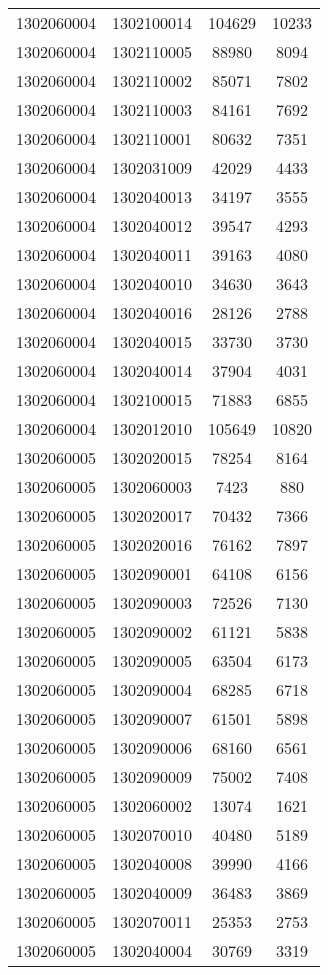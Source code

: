 \begin{longtable}{llcc}
1302060004 & 1302100014 & 104629 & 10233\\
1302060004 & 1302110005 & 88980 & 8094\\
1302060004 & 1302110002 & 85071 & 7802\\
1302060004 & 1302110003 & 84161 & 7692\\
1302060004 & 1302110001 & 80632 & 7351\\
1302060004 & 1302031009 & 42029 & 4433\\
1302060004 & 1302040013 & 34197 & 3555\\
1302060004 & 1302040012 & 39547 & 4293\\
1302060004 & 1302040011 & 39163 & 4080\\
1302060004 & 1302040010 & 34630 & 3643\\
1302060004 & 1302040016 & 28126 & 2788\\
1302060004 & 1302040015 & 33730 & 3730\\
1302060004 & 1302040014 & 37904 & 4031\\
1302060004 & 1302100015 & 71883 & 6855\\
1302060004 & 1302012010 & 105649 & 10820\\
1302060005 & 1302020015 & 78254 & 8164\\
1302060005 & 1302060003 & 7423 & 880\\
1302060005 & 1302020017 & 70432 & 7366\\
1302060005 & 1302020016 & 76162 & 7897\\
1302060005 & 1302090001 & 64108 & 6156\\
1302060005 & 1302090003 & 72526 & 7130\\
1302060005 & 1302090002 & 61121 & 5838\\
1302060005 & 1302090005 & 63504 & 6173\\
1302060005 & 1302090004 & 68285 & 6718\\
1302060005 & 1302090007 & 61501 & 5898\\
1302060005 & 1302090006 & 68160 & 6561\\
1302060005 & 1302090009 & 75002 & 7408\\
1302060005 & 1302060002 & 13074 & 1621\\
1302060005 & 1302070010 & 40480 & 5189\\
1302060005 & 1302040008 & 39990 & 4166\\
1302060005 & 1302040009 & 36483 & 3869\\
1302060005 & 1302070011 & 25353 & 2753\\
1302060005 & 1302040004 & 30769 & 3319\\

\end{longtable}
